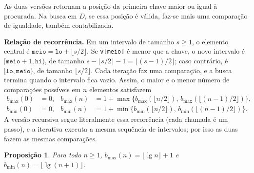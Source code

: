 \documentclass[11pt,a4paper]{article}
\newtheorem{proposicao}{Proposição}
\begin{document}
As duas versões retornam a posição da primeira chave maior ou igual à procurada. Na busca em $D$, se essa posição é válida, faz-se mais uma comparação de igualdade, também contabilizada.

\textbf{Relação de recorrência.} Em um intervalo de tamanho $s\ge1$, o elemento central é $\texttt{meio}=\texttt{lo}+\lfloor s/2\rfloor$. Se \texttt{v[meio]} é menor que a chave, o novo intervalo é $[\texttt{meio}+1,\texttt{hi})$, de tamanho $s-\lfloor s/2\rfloor-1=\lfloor(s-1)/2\rfloor$; caso contrário, é $[\texttt{lo},\texttt{meio})$, de tamanho $\lfloor s/2\rfloor$. Cada iteração faz uma comparação, e a busca termina quando o intervalo fica vazio. Assim, o maior e o menor número de comparações possíveis em $n$ elementos satisfazem
\begin{equation}
\begin{aligned}
b_{\max}(0)&=0, & b_{\max}(n)&=1+\max\{b_{\max}(\lfloor n/2\rfloor),\,b_{\max}(\lfloor(n-1)/2\rfloor)\},\\
b_{\min}(0)&=0, & b_{\min}(n)&=1+\min\{b_{\min}(\lfloor n/2\rfloor),\,b_{\min}(\lfloor(n-1)/2\rfloor)\}.
\end{aligned}
\label{eq:recbb}
\end{equation}
A versão recursiva segue literalmente essa recorrência (cada chamada é um passo), e a iterativa executa a mesma sequência de intervalos; por isso as duas fazem as mesmas comparações.

\begin{proposicao}
\label{prop:bb}
Para todo $n\ge1$, $b_{\max}(n)=\lfloor\lg n\rfloor+1$ e $b_{\min}(n)=\lfloor\lg(n+1)\rfloor$.
\end{proposicao}
\end{document}
